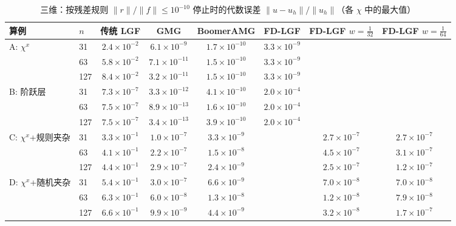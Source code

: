 \begin{table}[H]\centering\small
\caption{三维：按残差规则 $\|r\|/\|f\|\le10^{-10}$ 停止时的代数误差 $\|u-u_h\|/\|u_h\|$（各 $\chi$ 中的最大值）}\label{tab:err3d}
\begin{adjustbox}{max width=\textwidth}
\begin{tabular}{llcccccc}
\toprule
算例 & $n$ & 传统 LGF & GMG & BoomerAMG & FD-LGF & FD-LGF $w{=}\frac1{32}$ & FD-LGF $w{=}\frac1{64}$ \\
\midrule
A: $\chi^x$ & 31 & $2.4{\times}10^{-2}$ & $6.1{\times}10^{-9}$ & $1.7{\times}10^{-10}$ & $3.3{\times}10^{-9}$ &  &  \\
 & 63 & $5.8{\times}10^{-2}$ & $7.1{\times}10^{-11}$ & $1.5{\times}10^{-10}$ & $3.3{\times}10^{-9}$ &  &  \\
 & 127 & $8.4{\times}10^{-2}$ & $3.2{\times}10^{-11}$ & $1.5{\times}10^{-10}$ & $3.3{\times}10^{-9}$ &  &  \\
\midrule
B: 阶跃层 & 31 & $7.3{\times}10^{-7}$ & $3.3{\times}10^{-12}$ & $4.1{\times}10^{-10}$ & $2.0{\times}10^{-4}$ &  &  \\
 & 63 & $7.5{\times}10^{-7}$ & $8.9{\times}10^{-13}$ & $1.6{\times}10^{-10}$ & $2.0{\times}10^{-4}$ &  &  \\
 & 127 & $7.5{\times}10^{-7}$ & $3.4{\times}10^{-13}$ & $3.9{\times}10^{-10}$ & $2.0{\times}10^{-4}$ &  &  \\
\midrule
C: $\chi^x$+规则夹杂 & 31 & $3.3{\times}10^{-1}$ & $1.0{\times}10^{-7}$ & $3.3{\times}10^{-9}$ &  & $2.7{\times}10^{-7}$ & $2.7{\times}10^{-7}$ \\
 & 63 & $4.1{\times}10^{-1}$ & $2.2{\times}10^{-7}$ & $1.5{\times}10^{-8}$ &  & $4.5{\times}10^{-7}$ & $3.1{\times}10^{-7}$ \\
 & 127 & $4.4{\times}10^{-1}$ & $2.9{\times}10^{-7}$ & $2.4{\times}10^{-9}$ &  & $2.5{\times}10^{-7}$ & $1.2{\times}10^{-7}$ \\
\midrule
D: $\chi^x$+随机夹杂 & 31 & $5.4{\times}10^{-1}$ & $3.0{\times}10^{-7}$ & $6.6{\times}10^{-9}$ &  & $7.0{\times}10^{-8}$ & $7.0{\times}10^{-8}$ \\
 & 63 & $6.3{\times}10^{-1}$ & $6.0{\times}10^{-8}$ & $1.3{\times}10^{-8}$ &  & $1.2{\times}10^{-8}$ & $7.9{\times}10^{-8}$ \\
 & 127 & $6.6{\times}10^{-1}$ & $9.9{\times}10^{-9}$ & $4.4{\times}10^{-9}$ &  & $3.2{\times}10^{-8}$ & $1.7{\times}10^{-7}$ \\
\bottomrule
\end{tabular}
\end{adjustbox}
\end{table}

